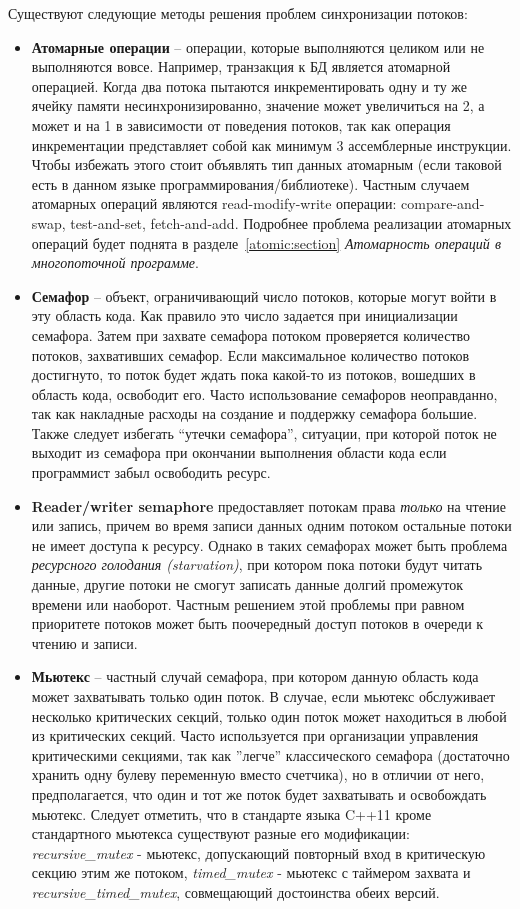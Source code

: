 Существуют следующие методы решения проблем синхронизации потоков:
\begin{itemize}
    \item\textbf{Атомарные операции} -- операции, которые выполняются целиком или не выполняются вовсе. Например, транзакция к БД является атомарной операцией. Когда два потока пытаются инкрементировать одну и ту же ячейку памяти несинхронизированно, значение может увеличиться на 2, а может и на 1 в зависимости от поведения потоков, так как операция инкрементации представляет собой как минимум 3 ассемблерные инструкции. Чтобы избежать этого стоит объявлять тип данных атомарным (если таковой есть в данном языке программирования/библиотеке). Частным случаем атомарных операций являются read-modify-write операции: compare-and-swap, test-and-set, fetch-and-add. Подробнее проблема реализации атомарных операций будет поднята в разделе~\ref{atomic:section} \textit{Атомарность операций в многопоточной программе}.
    
    \item\textbf{Семафор} -- объект, ограничивающий число потоков, которые могут войти в эту область кода. Как правило это число задается при инициализации семафора. Затем при захвате семафора потоком проверяется количество потоков, захвативших семафор. Если максимальное количество потоков достигнуто, то поток будет ждать пока какой-то из потоков, вошедших в область кода, освободит его. Часто использование семафоров неоправданно, так как накладные расходы на создание и поддержку семафора большие. Также следует избегать ``утечки семафора'', ситуации, при которой поток не выходит из семафора при окончании выполнения области кода если программист забыл освободить ресурс.
    
    \item\textbf{Reader/writer semaphore} предоставляет потокам права \textit{только} на чтение или запись, причем во время записи данных одним потоком остальные потоки не имеет доступа к ресурсу. Однако в таких семафорах может быть проблема \textit{ресурсного голодания (starvation)}, при котором пока потоки будут читать данные, другие потоки не смогут записать данные долгий промежуток времени или наоборот. Частным решением этой проблемы при равном приоритете потоков может быть поочередный доступ потоков в очереди к чтению и записи.
    
    \item{\textbf{Мьютекс} -- частный случай семафора, при котором данную область кода может захватывать только один поток. В случае, если мьютекс обслуживает несколько критических секций, только один поток может находиться в любой из критических секций. Часто используется при организации управления критическими секциями, так как ''легче'' классического семафора (достаточно хранить одну булеву переменную вместо счетчика), но в отличии от него, предполагается, что один и тот же поток будет захватывать и освобождать мьютекс. Следует отметить, что в стандарте языка C++11 кроме стандартного мьютекса существуют разные его модификации:  \textit{recursive\_mutex} - мьютекс, допускающий повторный вход в критическую секцию этим же потоком, 
    \textit{timed\_mutex} - мьютекс с таймером захвата и  \textit{recursive\_timed\_mutex}, совмещающий достоинства обеих версий.}
    

\end{itemize}
